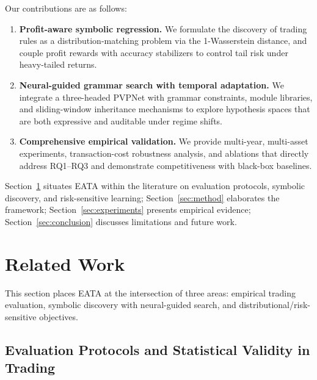 \documentclass{elektr}
\theoremstyle{corollary}
\theoremstyle{lemma}
\theoremstyle{proposition}
\theoremstyle{axiom}
\theoremstyle{conjecture}
\theoremstyle{example}
\theoremstyle{definition}
\theoremstyle{remark}
\begin{document}
Our contributions are as follows:
\begin{enumerate}
    \item \textbf{Profit-aware symbolic regression.} We formulate the discovery of trading rules as a distribution-matching problem via the 1-Wasserstein distance, and couple profit rewards with accuracy stabilizers to control tail risk under heavy-tailed returns.
    \item \textbf{Neural-guided grammar search with temporal adaptation.} We integrate a three-headed PVPNet with grammar constraints, module libraries, and sliding-window inheritance mechanisms to explore hypothesis spaces that are both expressive and auditable under regime shifts.
    \item \textbf{Comprehensive empirical validation.} We provide multi-year, multi-asset experiments, transaction-cost robustness analysis, and ablations that directly address RQ1--RQ3 and demonstrate competitiveness with black-box baselines.
\end{enumerate}


Section~\ref{sec:related} situates EATA within the literature on evaluation protocols, symbolic discovery, and risk-sensitive learning; Section~\ref{sec:method} elaborates the framework; Section~\ref{sec:experiments} presents empirical evidence; Section~\ref{sec:conclusion} discusses limitations and future work.

\section{Related Work}
\label{sec:related}

This section places EATA at the intersection of three areas: empirical trading evaluation, symbolic discovery with neural-guided search, and distributional/risk-sensitive objectives.

\subsection{Evaluation Protocols and Statistical Validity in Trading}
\end{document}
